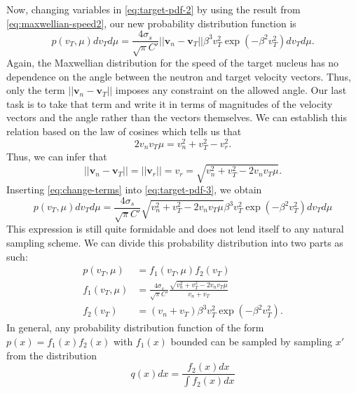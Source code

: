 Now, changing variables in \eqref{eq:target-pdf-2} by using the result from
\eqref{eq:maxwellian-speed2}, our new probability distribution function is
\begin{equation}
  \label{eq:target-pdf-3}
  p( v_T, \mu ) dv_T d\mu = \frac{4\sigma_s}{\sqrt{\pi}C'} || \mathbf{v}_n -
  \mathbf{v}_T || \beta^3 v_T^2 \exp \left ( -\beta^2 v_T^2 \right ) dv_T d\mu.
\end{equation}
Again, the Maxwellian distribution for the speed of the target nucleus has no
dependence on the angle between the neutron and target velocity vectors. Thus,
only the term $|| \mathbf{v}_n - \mathbf{v}_T ||$ imposes any constraint
on the allowed angle. Our last task is to take that term and write it in terms
of magnitudes of the velocity vectors and the angle rather than the vectors
themselves. We can establish this relation based on the law of cosines which
tells us that
\begin{equation}
  \label{eq:lawcosine}
  2 v_n v_T \mu = v_n^2 + v_T^2 - v_r^2.
\end{equation}
Thus, we can infer that
\begin{equation}
  \label{eq:change-terms}
  || \mathbf{v}_n - \mathbf{v}_T || = || \mathbf{v}_r || = v_r = \sqrt{v_n^2 +
    v_T^2 - 2v_n v_T \mu}.
\end{equation}
Inserting \eqref{eq:change-terms} into \eqref{eq:target-pdf-3}, we obtain
\begin{equation}
  \label{eq:target-pdf-4}
  p( v_T, \mu ) dv_T d\mu = \frac{4\sigma_s}{\sqrt{\pi}C'} \sqrt{v_n^2 +
    v_T^2 - 2v_n v_T \mu} \beta^3 v_T^2 \exp \left ( -\beta^2 v_T^2 \right )
  dv_T d\mu
\end{equation}
This expression is still quite formidable and does not lend itself to any
natural sampling scheme. We can divide this probability distribution into two
parts as such:
\begin{align}
  \label{eq:divide-pdf-p}
  p(v_T, \mu) &= f_1(v_T, \mu) f_2(v_T) \\
  \label{eq:divide-pdf-f1}
  f_1(v_T, \mu) &= \frac{4\sigma_s}{\sqrt{\pi} C'} \frac{ \sqrt{v_n^2 + v_T^2 -
      2v_n v_T \mu}}{v_n + v_T} \\
  \label{eq:divide-pdf-f2}
  f_2(v_T) &= (v_n + v_T) \beta^3 v_T^2 \exp \left ( -\beta^2 v_T^2 \right ).
\end{align}
In general, any probability distribution function of the form $p(x) =
f_1(x) f_2(x)$ with $f_1(x)$ bounded can be sampled by sampling
$x'$ from the distribution
\begin{equation}
  \label{eq:freegas-f2}
  q(x) dx = \frac{f_2(x) dx}{\int f_2(x) dx}
\end{equation}
